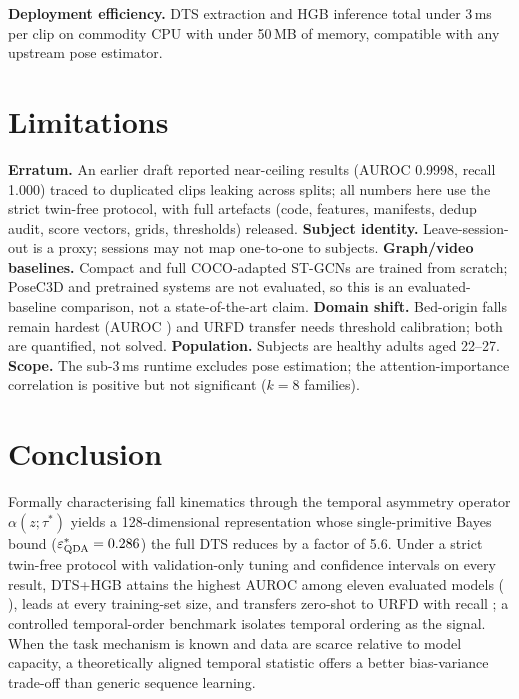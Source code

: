 \documentclass[letterpaper]{article}
\begin{document}
\textbf{Deployment efficiency.} DTS extraction and HGB inference total under 3\,ms per clip on commodity CPU with under 50\,MB of memory, compatible with any upstream pose estimator.

\section{Limitations}
\textbf{Erratum.} An earlier draft reported near-ceiling results (AUROC 0.9998, recall 1.000) traced to duplicated clips leaking across splits; all numbers here use the strict twin-free protocol, with full artefacts (code, features, manifests, dedup audit, score vectors, grids, thresholds) released. \textbf{Subject identity.} Leave-session-out is a proxy; sessions may not map one-to-one to subjects. \textbf{Graph/video baselines.} Compact and full COCO-adapted ST-GCNs are trained from scratch; PoseC3D and pretrained systems are not evaluated, so this is an evaluated-baseline comparison, not a state-of-the-art claim. \textbf{Domain shift.} Bed-origin falls remain hardest (AUROC \lfoBedauroc) and URFD transfer needs threshold calibration; both are quantified, not solved. \textbf{Population.} Subjects are healthy adults aged 22--27. \textbf{Scope.} The sub-3\,ms runtime excludes pose estimation; the attention-importance correlation is positive but not significant ($k{=}8$ families).

\section{Conclusion}
Formally characterising fall kinematics through the temporal asymmetry operator $\alpha(z;\tau^*)$ yields a 128-dimensional representation whose single-primitive Bayes bound ($\varepsilon^*_{\mathrm{QDA}} = 0.286$) the full DTS reduces by a factor of 5.6. Under a strict twin-free protocol with validation-only tuning and confidence intervals on every result, DTS+HGB attains the highest AUROC among eleven evaluated models (\DTSHGBauroc{} \DTSHGBaurocCI), leads at every training-set size, and transfers zero-shot to URFD with recall \urfdrec; a controlled temporal-order benchmark isolates temporal ordering as the signal. When the task mechanism is known and data are scarce relative to model capacity, a theoretically aligned temporal statistic offers a better bias-variance trade-off than generic sequence learning.


\end{document}
